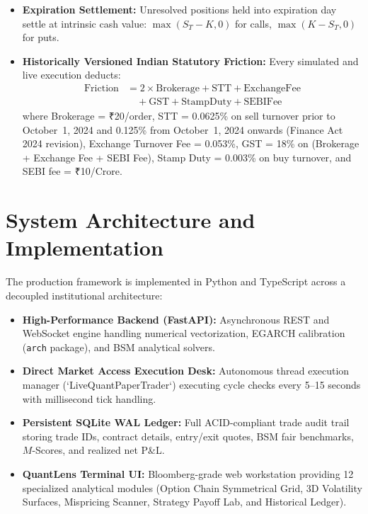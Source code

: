 \documentclass[journal]{IEEEtran}
\begin{document}
\begin{itemize}
\begin{itemize}
        \item \emph{Long Option:} Take-profit at $P_{\mathrm{tp}} = \max(P_{\mathrm{fair}}, P_{\mathrm{entry}} \times 1.25)$; Stop-loss at $P_{\mathrm{sl}} = P_{\mathrm{entry}} \times 0.90$.
    \end{itemize}
    \item \textbf{Expiration Settlement:} Unresolved positions held into expiration day settle at intrinsic cash value: $\max(S_T - K, 0)$ for calls, $\max(K - S_T, 0)$ for puts.
    \item \textbf{Historically Versioned Indian Statutory Friction:} Every simulated and live execution deducts:
    \begin{equation}
    \begin{aligned}
    \mathrm{Friction} &= 2 \times \mathrm{Brokerage} + \mathrm{STT} + \mathrm{ExchangeFee} \\
    &\quad + \mathrm{GST} + \mathrm{StampDuty} + \mathrm{SEBIFee}
    \end{aligned}
    \end{equation}
    where Brokerage = ₹20/order, STT = 0.0625\% on sell turnover prior to October~1, 2024 and 0.125\% from October~1, 2024 onwards (Finance Act 2024 revision), Exchange Turnover Fee = 0.053\%, GST = 18\% on (Brokerage + Exchange Fee + SEBI Fee), Stamp Duty = 0.003\% on buy turnover, and SEBI fee = ₹10/Crore.
\end{itemize}

\section{System Architecture and Implementation}

The production framework is implemented in Python and TypeScript across a decoupled institutional architecture:
\begin{itemize}
    \item \textbf{High-Performance Backend (FastAPI):} Asynchronous REST and WebSocket engine handling numerical vectorization, EGARCH calibration (\texttt{arch} package), and BSM analytical solvers.
    \item \textbf{Direct Market Access Execution Desk:} Autonomous thread execution manager (`LiveQuantPaperTrader`) executing cycle checks every 5--15 seconds with millisecond tick handling.
    \item \textbf{Persistent SQLite WAL Ledger:} Full ACID-compliant trade audit trail storing trade IDs, contract details, entry/exit quotes, BSM fair benchmarks, $M$-Scores, and realized net P\&L.
    \item \textbf{QuantLens Terminal UI:} Bloomberg-grade web workstation providing 12 specialized analytical modules (Option Chain Symmetrical Grid, 3D Volatility Surfaces, Mispricing Scanner, Strategy Payoff Lab, and Historical Ledger).
\end{itemize}
\end{document}
